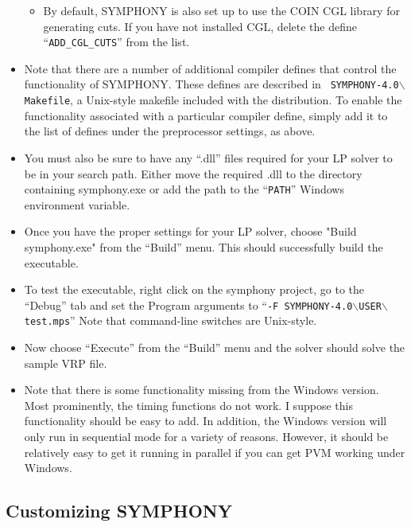 \begin{itemize}
\begin{itemize}
\item By default, SYMPHONY is also set up to use the COIN CGL library for
generating cuts. If you have not installed CGL, delete the define
``\texttt{ADD\_CGL\_CUTS}'' from the list.


\end{itemize}

\item Note that there are a number of additional compiler defines that control
the functionality of SYMPHONY. These defines are described in {\tt
SYMPHONY-4.0$\backslash$Makefile}, a Unix-style makefile included with the
distribution. To enable the functionality associated with a particular
compiler define, simply add it to the list of defines under the preprocessor
settings, as above.

\item You must also be sure to have any ``.dll'' files required for your LP 
solver to be in your search path. Either move the required .dll to the
directory containing symphony.exe or add the path to the ``{\tt PATH}''
Windows environment variable.

\item Once you have the proper settings for your LP solver, choose "Build
symphony.exe" from the ``Build'' menu. This should successfully build the
executable.

\item To test the executable, right click on the symphony project, go to the
``Debug'' tab and set the Program arguments to ``{\tt -F
SYMPHONY-4.0$\backslash$USER$\backslash$test.mps}'' Note that command-line
switches are Unix-style. 

\item Now choose ``Execute'' from the ``Build'' menu and the solver should 
solve the sample VRP file.

\item Note that there is some functionality missing from the Windows
version. Most prominently, the timing functions do not work. I suppose this
functionality should be easy to add. In addition, the Windows
version will only run in sequential mode for a variety of reasons. However, it
should be relatively easy to get it running in parallel if you can get PVM
working under Windows.

\end{itemize}

\subsection{Customizing SYMPHONY}

